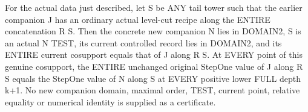 \begin{theorem}
\label{hir:original-bound-two-companion-stepone-rebase-values}
\leanok
For the actual data just described, let S be ANY tail tower such that the
earlier companion J has an ordinary actual level-cut recipe along the
ENTIRE concatenation R S. Then the concrete new companion N lies in
DOMAIN2, S is an actual N TEST, its current controlled record lies in
DOMAIN2, and its ENTIRE current cosupport equals that of J along R S.
At EVERY point of this genuine cosupport, the ENTIRE unchanged original
StepOne value of J along R S equals the StepOne value of N along S at
EVERY positive lower FULL depth k+1. No new companion domain, maximal
order, TEST, current point, relative equality or numerical identity is
supplied as a certificate.
\end{theorem}

